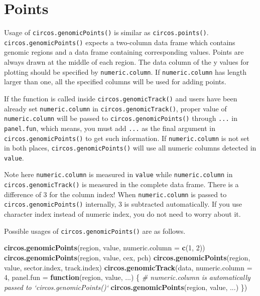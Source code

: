 \documentclass[]{book}
\newenvironment{Shaded}{\begin{snugshade}}{\end{snugshade}}
\newcommand{\KeywordTok}[1]{\textcolor[rgb]{0.13,0.29,0.53}{\textbf{#1}}}
\newcommand{\DataTypeTok}[1]{\textcolor[rgb]{0.13,0.29,0.53}{#1}}
\newcommand{\DecValTok}[1]{\textcolor[rgb]{0.00,0.00,0.81}{#1}}
\newcommand{\CommentTok}[1]{\textcolor[rgb]{0.56,0.35,0.01}{\textit{#1}}}
\newcommand{\ControlFlowTok}[1]{\textcolor[rgb]{0.13,0.29,0.53}{\textbf{#1}}}
\newcommand{\NormalTok}[1]{#1}
\begin{document}
\section{Points}\label{genomic-points}

Usage of \texttt{circos.genomicPoints()} is similar as
\texttt{circos.points()}. \texttt{circos.genomicPoints()} expects a
two-column data frame which contains genomic regions and a data frame
containing corresponding values. Points are always drawn at the middle
of each region. The data column of the y values for plotting should be
specified by \texttt{numeric.column}. If \texttt{numeric.column} has
length larger than one, all the specified columns will be used for
adding points.

If the function is called inside \texttt{circos.genomicTrack()} and
users have been already set \texttt{numeric.column} in
\texttt{circos.genomicTrack()}, proper value of \texttt{numeric.column}
will be passed to \texttt{circos.genomicPoints()} through \texttt{...}
in \texttt{panel.fun}, which means, you must add \texttt{...} as the
final argument in \texttt{circos.genomicPoints()} to get such
information. If \texttt{numeric.column} is not set in both places,
\texttt{circos.genomicPoints()} will use all numeric columns detected in
\texttt{value}.

Note here \texttt{numeric.column} is measured in \texttt{value} while
\texttt{numeric.column} in \texttt{circos.genomicTrack()} is measured in
the complete data frame. There is a difference of 3 for the column
index! When \texttt{numeric.column} is passed to
\texttt{circos.genomicPoints()} internally, 3 is subtracted
automatically. If you use character index instead of numeric index, you
do not need to worry about it.

Possible usages of \texttt{circos.genomicPoints()} are as follows.

\begin{Shaded}
\begin{Highlighting}[]
\KeywordTok{circos.genomicPoints}\NormalTok{(region, value, }\DataTypeTok{numeric.column =} \KeywordTok{c}\NormalTok{(}\DecValTok{1}\NormalTok{, }\DecValTok{2}\NormalTok{))}
\KeywordTok{circos.genomicPoints}\NormalTok{(region, value, cex, pch)}
\KeywordTok{circos.genomicPoints}\NormalTok{(region, value, sector.index, track.index)}
\KeywordTok{circos.genomicTrack}\NormalTok{(data, }\DataTypeTok{numeric.column =} \DecValTok{4}\NormalTok{, }
    \DataTypeTok{panel.fun =} \ControlFlowTok{function}\NormalTok{(region, value, ...) \{}
        \CommentTok{# numeric.column is automatically passed to `circos.genomicPoints()`}
        \KeywordTok{circos.genomicPoints}\NormalTok{(region, value, ...)}
\NormalTok{\})}
\end{Highlighting}
\end{Shaded}
\end{document}
